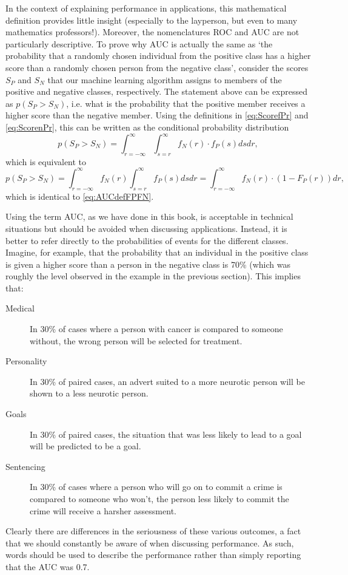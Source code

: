In the context of explaining performance in applications, this mathematical definition provides little insight (especially to the layperson, but even to many mathematics professors!). Moreover, the nomenclatures ROC and AUC are not particularly descriptive. To prove why AUC is actually the same as `the probability that a randomly chosen individual from the positive class has a higher score than a randomly chosen person from the negative class', consider the scores $S_P$ and $S_N$ that our machine learning algorithm assigns to members of the positive and negative classes, respectively. The statement above can be expressed as \hbox{$p(S_P>S_N)$}, i.e. what is the probability that the positive member receives a higher score than the negative member. Using the definitions in \eqref{eq:ScorefPr} and \eqref{eq:ScorenPr}, this can be written as the conditional probability distribution
\begin{equation}
p(S_P>S_N) = \int_{r=-\infty}^{\infty} \int_{s=r}^{\infty}  f_N(r) \cdot  f_P(s) ds dr,  \label{eq:SPgreaterSN}
\end{equation}
which is equivalent to
\begin{equation}
p(S_P>S_N) = \int_{r=-\infty}^{\infty}  f_N(r)  \int_{s=r}^{\infty}  f_P(s) ds dr  = \int_{r=-\infty}^{\infty}  f_N(r) \cdot  \left(1 -  F_P(r) \right) dr, \label{eq:SPgreaterSN2}
\end{equation}
which is identical to \eqref{eq:AUCdefFPFN}.


Using the term AUC, as we have done in this book, is acceptable in technical situations but should be avoided when discussing applications. Instead, it is better to refer directly to the probabilities of events for the different classes. Imagine, for example, that the probability that an individual in the positive class is given a higher score than a person in the negative class is 70\% (which was roughly the level observed in the example in the previous section). This implies that:
\begin{description}
\item[Medical] In 30\% of cases where a person with cancer is compared to someone without, the wrong person will be selected for treatment.
\item[Personality] In 30\% of paired cases, an advert suited to a more neurotic person will be shown to a less neurotic person.
\item[Goals] In 30\% of paired cases, the situation that was less likely to lead to a goal will be predicted to be a goal.
\item[Sentencing] In 30\% of cases where a person who will go on to commit a crime is compared to someone who won't, the person less likely to commit the crime will receive a harsher assessment.
\end{description}
Clearly there are differences in the seriousness of these various outcomes, a fact that we should constantly be aware of when discussing performance. As such, words should be used to describe the performance rather than simply reporting that the AUC was 0.7.

